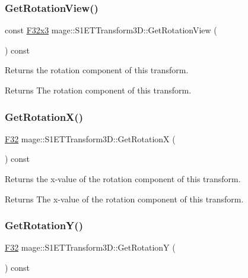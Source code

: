 \subsubsection{\texorpdfstring{Get\+Rotation\+View()}{GetRotationView()}}
{\footnotesize\ttfamily const \mbox{\hyperlink{namespacemage_a1e3c7a882af461f161caa1cbddaf1fa2}{F32x3}} mage\+::\+S1\+E\+T\+Transform3\+D\+::\+Get\+Rotation\+View (\begin{DoxyParamCaption}{ }\end{DoxyParamCaption}) const\hspace{0.3cm}{\ttfamily [noexcept]}}

Returns the rotation component of this transform.

\begin{DoxyReturn}{Returns}
The rotation component of this transform. 
\end{DoxyReturn}
\mbox{\label{classmage_1_1_s1_e_t_transform3_d_a6edf045f2e969bc325b52dd3027465e7}} 
\subsubsection{\texorpdfstring{Get\+Rotation\+X()}{GetRotationX()}}
{\footnotesize\ttfamily \mbox{\hyperlink{namespacemage_aa97e833b45f06d60a0a9c4fc22ae02c0}{F32}} mage\+::\+S1\+E\+T\+Transform3\+D\+::\+Get\+RotationX (\begin{DoxyParamCaption}{ }\end{DoxyParamCaption}) const\hspace{0.3cm}{\ttfamily [noexcept]}}

Returns the x-\/value of the rotation component of this transform.

\begin{DoxyReturn}{Returns}
The x-\/value of the rotation component of this transform. 
\end{DoxyReturn}
\mbox{\label{classmage_1_1_s1_e_t_transform3_d_aea679972dab8ec6a3e02d73ec5198ffd}} 
\subsubsection{\texorpdfstring{Get\+Rotation\+Y()}{GetRotationY()}}
{\footnotesize\ttfamily \mbox{\hyperlink{namespacemage_aa97e833b45f06d60a0a9c4fc22ae02c0}{F32}} mage\+::\+S1\+E\+T\+Transform3\+D\+::\+Get\+RotationY (\begin{DoxyParamCaption}{ }\end{DoxyParamCaption}) const\hspace{0.3cm}{\ttfamily [noexcept]}}

